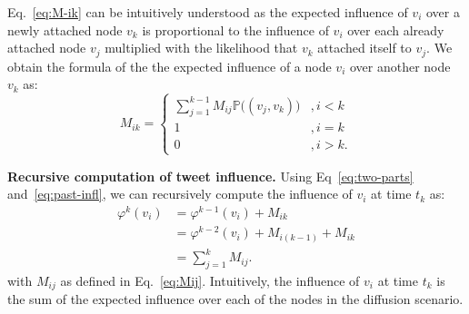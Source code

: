 Eq.~\eqref{eq:M-ik} can be intuitively understood as the expected influence of $v_i$ over a newly attached node $v_k$ is proportional to the influence of $v_i$ over each already attached node $v_j$ multiplied with the likelihood that $v_k$ attached itself to $v_j$.
We obtain the formula of the the expected influence of a node $v_i$ over another node $v_k$ as:
%
\begin{equation} \label{eq:Mij}
M_{ik}=
\left\{
\begin{array}{ll}
	\sum^{k-1}_{j=1}M_{ij}\mathds{P}\big((v_j, v_k)\big) &,i < k \\
	1 & ,i = k \\
	0 & ,i > k.
\end{array}
\right.
\end{equation} 

\textbf{Recursive computation of tweet influence.}
Using Eq~\eqref{eq:two-parts} and~\eqref{eq:past-infl}, we can recursively compute the influence of $v_i$ at time $t_k$ as:
\begin{align}
	\varphi^k(v_i) &= \varphi^{k-1}(v_i) + M_{ik} \nonumber \\
				   &= \varphi^{k-2}(v_i) + M_{i(k-1)} + M_{ik} \nonumber \\
				   &= \sum_{j=1}^k M_{ij}. 
\end{align}
with $M_{ij}$ as defined in Eq.~\eqref{eq:Mij}.
Intuitively, the influence of $v_i$ at time $t_k$ is the sum of the expected influence over each of the nodes in the diffusion scenario.

